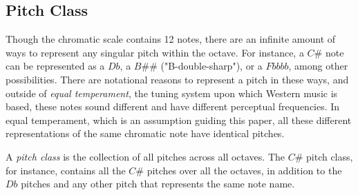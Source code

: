 \subsection{Pitch Class}

Though the chromatic scale contains 12 notes, there are an infinite amount of ways to represent any singular pitch within the octave. For instance, a $C\#$ note can be represented as a $Db$, a $B\#\#$ ("B-double-sharp"), or a $Fbbbb$, among other possibilities. There are notational reasons to represent a pitch in these ways, and outside of \textit{equal temperament}, the tuning system upon which Western music is based, these notes sound different and have different perceptual frequencies. In equal temperament, which is an assumption guiding this paper, all these different representations of the same chromatic note have identical pitches.

A \textit{pitch class} is the collection of all pitches across all octaves. The $C\#$ pitch class, for instance, contains all the $C\#$ pitches over all the octaves, in addition to the $Db$ pitches and any other pitch that represents the same note name.